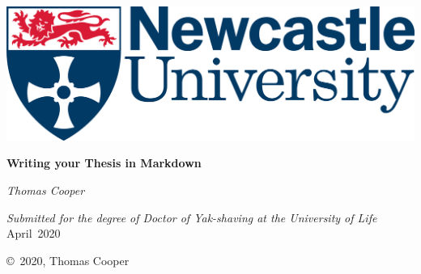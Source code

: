 \begin{titlepage}
\newpage
\begin{center}
\includegraphics[width=.6\linewidth]{images/Newcastle_University_logo.png}

\begin{singlespace}
\vspace{30mm} 
{\bf\huge Writing your Thesis in Markdown}
\end{singlespace}

\vspace{30mm}
{\Huge\sl Thomas Cooper}

\vspace{30mm}

\begin{minipage}[t]{5in}
\begin{center}
{\LARGE \textit{Submitted for the degree of Doctor of Yak-shaving at the University of
    Life}}\\
\vspace{10mm}
{\LARGE April\ 2020}                    %
\end{center}
\end{minipage}

\vspace{40mm}
\copyright\ 2020, Thomas Cooper

\end{center}
\end{titlepage}

